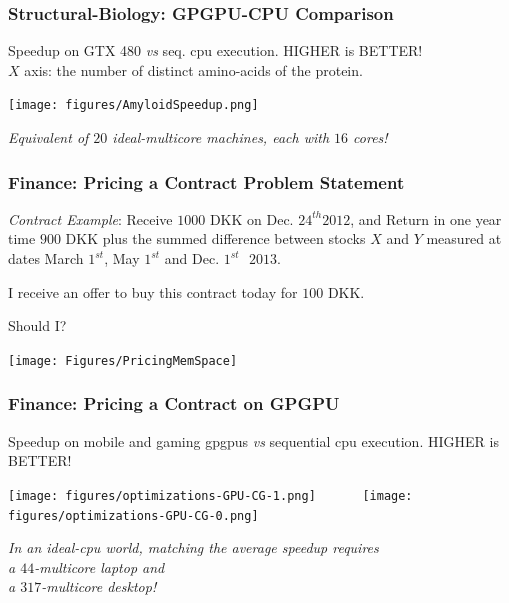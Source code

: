 \documentclass{beamer}
\renewcommand{\emph}[1]{\textcolor{structure}{#1}}
\newcommand{\emp}[1]{\textcolor{DikuRed}{ #1}}
\begin{document}
\begin{frame}
  \frametitle{Structural-Biology: GPGPU-CPU Comparison}

Speedup on GTX 480 {\em vs} seq. {\sc cpu} execution. HIGHER is BETTER!\\ $X$ axis: the number of distinct amino-acids of the protein.



\begin{center} 
    \texttt{[image: figures/AmyloidSpeedup.png]} 
\end{center} 

{\em \emp{Equivalent of $20$ ideal-multicore machines, each with $16$ cores!}}


\end{frame}

\begin{frame}[fragile,t]
\frametitle{Finance: Pricing a Contract Problem Statement}

{\em \emph{Contract Example}}: \emp{Receive} $1000$ DKK on Dec. $24^{th} 2012$, and \emp{Return} in one year 
                    time $900$ DKK plus the summed difference between stocks $X$ and 
                    $Y$ measured at dates March $1^{st}$, May $1^{st}$ and Dec. $1^{st} \mbox{ }2013$. 

\bigskip

I receive an offer to buy this contract today for $100$ DKK. 

\bigskip

\emph{Should I?} %

\bigskip

\begin{center}
\texttt{[image: Figures/PricingMemSpace]}
\end{center}

\end{frame}


\begin{frame}[fragile,t]
\frametitle{Finance: Pricing a Contract on GPGPU}

Speedup on mobile and gaming {\sc gpgpu}s {\em vs} sequential {\sc cpu} execution. HIGHER is BETTER!
\smallskip
\begin{center} 
\texttt{[image: figures/optimizations-GPU-CG-1.png]} 
$\mbox{ }\mbox{ }\mbox{ }\mbox{ }$
\texttt{[image: figures/optimizations-GPU-CG-0.png]} 
\end{center} 
\smallskip
{\em \emp{In an ideal-{\sc cpu} world, matching the average speedup requires\\ a $44$-multicore laptop and \\ a $317$-multicore desktop!}}

\end{frame}
\end{document}
